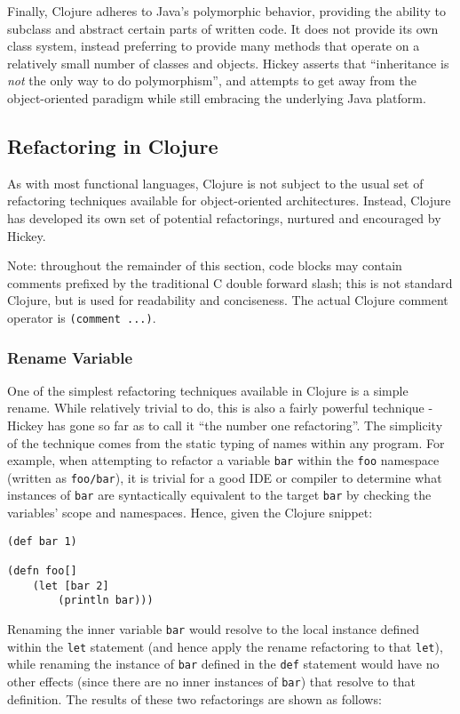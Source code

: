 \documentclass{article}
\begin{document}
Finally, Clojure adheres to Java's polymorphic behavior, providing the ability to subclass and abstract certain parts of written code. It does not provide its own class system, instead preferring to provide many methods that operate on a relatively small number of classes and objects. Hickey asserts that ``inheritance is \textit{not} the only way to do polymorphism''\cite{1}, and attempts to get away from the object-oriented paradigm while still embracing the underlying Java platform.

\subsection{Refactoring in Clojure}

As with most functional languages, Clojure is not subject to the usual set of refactoring techniques available for object-oriented architectures. Instead, Clojure has developed its own set of potential refactorings, nurtured and encouraged by Hickey.

Note: throughout the remainder of this section, code blocks may contain comments prefixed by the traditional C double forward slash; this is not standard Clojure, but is used for readability and conciseness. The actual Clojure comment operator is \verb!(comment ...)!.

\subsubsection{Rename Variable}

One of the simplest refactoring techniques available in Clojure is a simple rename. While relatively trivial to do, this is also a fairly powerful technique - Hickey has gone so far as to call it ``the number one refactoring''\cite{2}. The simplicity of the technique comes from the static typing of names within any program. For example, when attempting to refactor a variable \verb!bar! within the \verb!foo! namespace (written as \verb!foo/bar!), it is trivial for a good IDE or compiler to determine what instances of \verb!bar! are syntactically equivalent to the target \verb!bar! by checking the variables' scope and namespaces. Hence, given the Clojure snippet:

\begin{verbatim}
(def bar 1)

(defn foo[]
    (let [bar 2]
        (println bar)))
\end{verbatim}

Renaming the inner variable \verb!bar! would resolve to the local instance defined within the \verb!let! statement (and hence apply the rename refactoring to that \verb!let!), while renaming the instance of \verb!bar! defined in the \verb!def! statement would have no other effects (since there are no inner instances of \verb!bar!) that resolve to that definition. The results of these two refactorings are shown as follows:
\end{document}
